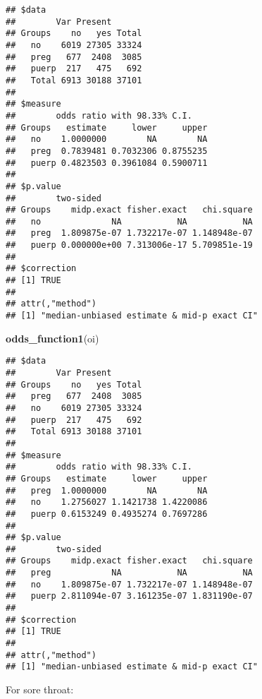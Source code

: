\documentclass[
]{article}
\newenvironment{Shaded}{\begin{snugshade}}{\end{snugshade}}
\newcommand{\DataTypeTok}[1]{\textcolor[rgb]{0.13,0.29,0.53}{#1}}
\newcommand{\KeywordTok}[1]{\textcolor[rgb]{0.13,0.29,0.53}{\textbf{#1}}}
\newcommand{\NormalTok}[1]{#1}
\newcommand{\OperatorTok}[1]{\textcolor[rgb]{0.81,0.36,0.00}{\textbf{#1}}}
\newcommand{\OtherTok}[1]{\textcolor[rgb]{0.56,0.35,0.01}{#1}}
\newcommand{\StringTok}[1]{\textcolor[rgb]{0.31,0.60,0.02}{#1}}
\begin{document}
\begin{verbatim}
## $data
##        Var Present
## Groups    no   yes Total
##   no    6019 27305 33324
##   preg   677  2408  3085
##   puerp  217   475   692
##   Total 6913 30188 37101
## 
## $measure
##        odds ratio with 98.33% C.I.
## Groups   estimate     lower     upper
##   no    1.0000000        NA        NA
##   preg  0.7839481 0.7032306 0.8755235
##   puerp 0.4823503 0.3961084 0.5900711
## 
## $p.value
##        two-sided
## Groups    midp.exact fisher.exact   chi.square
##   no              NA           NA           NA
##   preg  1.809875e-07 1.732217e-07 1.148948e-07
##   puerp 0.000000e+00 7.313006e-17 5.709851e-19
## 
## $correction
## [1] TRUE
## 
## attr(,"method")
## [1] "median-unbiased estimate & mid-p exact CI"
\end{verbatim}

\begin{Shaded}
\begin{Highlighting}[]
\KeywordTok{odds_function1}\NormalTok{(oi)}
\end{Highlighting}
\end{Shaded}

\begin{verbatim}
## $data
##        Var Present
## Groups    no   yes Total
##   preg   677  2408  3085
##   no    6019 27305 33324
##   puerp  217   475   692
##   Total 6913 30188 37101
## 
## $measure
##        odds ratio with 98.33% C.I.
## Groups   estimate     lower     upper
##   preg  1.0000000        NA        NA
##   no    1.2756027 1.1421738 1.4220086
##   puerp 0.6153249 0.4935274 0.7697286
## 
## $p.value
##        two-sided
## Groups    midp.exact fisher.exact   chi.square
##   preg            NA           NA           NA
##   no    1.809875e-07 1.732217e-07 1.148948e-07
##   puerp 2.811094e-07 3.161235e-07 1.831190e-07
## 
## $correction
## [1] TRUE
## 
## attr(,"method")
## [1] "median-unbiased estimate & mid-p exact CI"
\end{verbatim}

For sore throat:

\begin{Shaded}
\end{Shaded}
\end{document}
